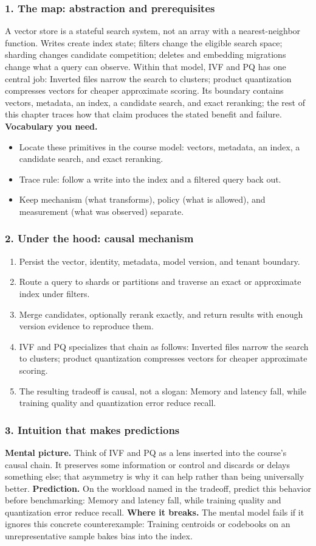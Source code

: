 \subsubsection*{1. The map: abstraction and prerequisites}
A vector store is a stateful search system, not an array with a nearest-neighbor function. Writes create index state; filters change the eligible search space; sharding changes candidate competition; deletes and embedding migrations change what a query can observe.
Within that model, IVF and PQ has one central job: Inverted files narrow the search to clusters; product quantization compresses vectors for cheaper approximate scoring. Its boundary contains vectors, metadata, an index, a candidate search, and exact reranking; the rest of this chapter traces how that claim produces the stated benefit and failure.
\textbf{Vocabulary you need.}\begin{itemize}
\item Locate these primitives in the course model: vectors, metadata, an index, a candidate search, and exact reranking.
\item Trace rule: follow a write into the index and a filtered query back out.
\item Keep mechanism (what transforms), policy (what is allowed), and measurement (what was observed) separate.
\end{itemize}
\subsubsection*{2. Under the hood: causal mechanism}\begin{enumerate}
\item Persist the vector, identity, metadata, model version, and tenant boundary.
\item Route a query to shards or partitions and traverse an exact or approximate index under filters.
\item Merge candidates, optionally rerank exactly, and return results with enough version evidence to reproduce them.
\item IVF and PQ specializes that chain as follows: Inverted files narrow the search to clusters; product quantization compresses vectors for cheaper approximate scoring.
\item The resulting tradeoff is causal, not a slogan: Memory and latency fall, while training quality and quantization error reduce recall.
\end{enumerate}
\subsubsection*{3. Intuition that makes predictions}
\textbf{Mental picture.} Think of IVF and PQ as a lens inserted into the course's causal chain. It preserves some information or control and discards or delays something else; that asymmetry is why it can help rather than being universally better.
\textbf{Prediction.} On the workload named in the tradeoff, predict this behavior before benchmarking: Memory and latency fall, while training quality and quantization error reduce recall.
\textbf{Where it breaks.} The mental model fails if it ignores this concrete counterexample: Training centroids or codebooks on an unrepresentative sample bakes bias into the index.
